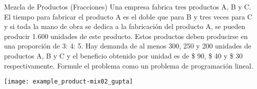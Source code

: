 \begin{frameExample}{Mezcla de Productos (Fracciones)}{}
Una empresa fabrica tres productos A, B y C. El tiempo para fabricar el producto A es el doble que para B y tres veces para C y si toda la mano de obra se dedica a la fabricación del producto A, se pueden producir 1.600 unidades de este producto. Estos productos deben producirse en una proporción de 3: 4: 5. Hay demanda de al menos 300, 250 y 200 unidades de productos A, B y C y el beneficio obtenido por unidad es de \$ 90, \$ 40 y \$ 30 respectivamente. Formule el problema como un problema de programación lineal.

{\centering
\texttt{[image: example\_product-mix02\_gupta]}
\par}

\end{frameExample}



